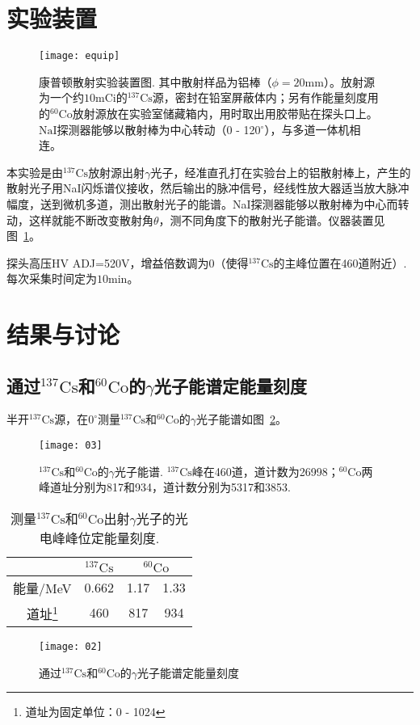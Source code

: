 \documentclass[aps,pre,12pt,preprint,onecolumn,showpacs,showkeys]{revtex4-1}
\def \Cs {^{137}\mathrm{Cs}}
\def \Co{^{60}\mathrm{Co}}
\def \degree {^\circ}
\begin{document}
\section{实验装置}
\begin{figure}[h]
\centering
\texttt{[image: equip]}
\caption{\label{fig:equip}%
康普顿散射实验装置图. 其中散射样品为铝棒（$\phi=20\mathrm{mm}$）。放射源为一个约$10\mathrm{mCi}$的$\Cs$源，密封在铅室屏蔽体内；另有作能量刻度用的$^{60}\mathrm{Co}$放射源放在实验室储藏箱内，用时取出用胶带贴在探头口上。$\mathrm{NaI}$探测器能够以散射棒为中心转动（0 - 120$\degree$），与多道一体机相连。}
\end{figure}
本实验是由$\Cs$放射源出射$\gamma$光子，经准直孔打在实验台上的铝散射棒上，产生的散射光子用NaI闪烁谱仪接收，然后输出的脉冲信号，经线性放大器适当放大脉冲幅度，送到微机多道，测出散射光子的能谱。NaI探测器能够以散射棒为中心而转动，这样就能不断改变散射角$\theta$，测不同角度下的散射光子能谱。仪器装置见图~\ref{fig:equip}。

探头高压HV ADJ=520V，增益倍数调为0（使得$\Cs$的主峰位置在460道附近）. 每次采集时间定为$10\mathrm{min}$。

\section{结果与讨论}
\subsection{通过$\Cs$和$\Co$的$\gamma$光子能谱定能量刻度}
半开$\Cs$源，在$0\degree$测量$\Cs$和$\Co$的$\gamma$光子能谱如图~\ref{fig:fig3}。
\begin{figure}[h]
\centering
\texttt{[image: 03]}
\caption{\label{fig:fig3}%
$\Cs$和$\Co$的$\gamma$光子能谱. $\Cs$峰在460道，道计数为26998；$\Co$两峰道址分别为817和934，道计数分别为5317和3853.}
\end{figure}

\begin{table}[h]
\caption{\label{tab:table1}%
测量$\Cs$和$\Co$出射$\gamma$光子的光电峰峰位定能量刻度. }
\begin{tabular}{|c|c|c|c|}
\hline
&$\Cs$&\multicolumn{2}{|c|}{$\Co$}\\\hline
能量/MeV&0.662&1.17&1.33\\\hline
道址\footnote{道址为固定单位：0 - 1024}&460&817&934\\\hline
\end{tabular}
\end{table}
\begin{figure}[h]
\centering
\texttt{[image: 02]}
\caption{\label{fig:fit}%
通过$\Cs$和$\Co$的$\gamma$光子能谱定能量刻度}
\end{figure}
\end{document}
